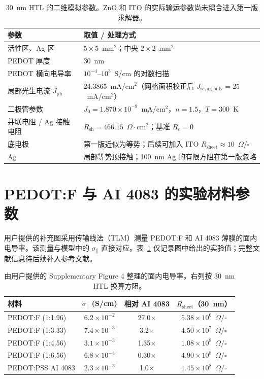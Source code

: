 \documentclass[UTF8,a4paper,11pt]{ctexart}
\newcommand{\sigpar}{\sigma_{\parallel}}
\newcommand{\Rs}{R_{\mathrm{sheet}}}
\begin{document}
\begin{table}[H]
\centering
\caption{30~nm HTL 的二维模拟参数。ZnO 和 ITO 的实际输运参数尚未耦合进入第一版求解器。}
\begin{tabularx}{0.93\textwidth}{>{\raggedright\arraybackslash}p{} X}
\toprule
参数 & 取值 / 处理方式 \\
\midrule
活性区、Ag 区 & $5\times5$~mm$^2$；中央 $2\times2$~mm$^2$ \\
PEDOT 厚度 & 30~nm \\
PEDOT 横向电导率 & $10^{-4}$--$10^3$~S/cm 的对数扫描 \\
局部光生电流 $J_{\mathrm{ph}}$ & 24.3865~mA/cm$^2$（网格面积校正后 $J_{\mathrm{sc,ag\_only}}=25$~mA/cm$^2$）\\
二极管参数 & $J_0=1.870\times10^{-9}$~mA/cm$^2$，$n=1.5$，$T=300$~K \\
并联电阻 / Ag 接触电阻 & $R_{\mathrm{sh}}=466.15$~$\Omega\cdot$cm$^2$；基准 $R_c=0$ \\
底电极 & 第一版近似为等势；后续可加入 ITO $\Rs\approx10$~$\Omega/\square$ \\
Ag & 局部等势顶接触；100~nm Ag 的有限方阻在第一版忽略 \\
\bottomrule
\end{tabularx}
\end{table}

\section{PEDOT:F 与 AI 4083 的实验材料参数}

用户提供的补充图采用传输线法（TLM）测量 PEDOT:F 和 AI 4083 薄膜的面内电导率。该测量与模型中的 $\sigpar$ 直接对应。表~\ref{tab:materials} 仅记录图中给出的实验值；完整文献信息待后续补入参考文献。

\begin{table}[H]
\centering
\caption{由用户提供的 Supplementary Figure 4 整理的面内电导率。右列按 30~nm HTL 换算方阻。}
\label{tab:materials}
\begin{tabular}{lccc}
\toprule
材料 & $\sigpar$ (S/cm) & 相对 AI 4083 & $\Rs$（30~nm） \\
\midrule
PEDOT:F (1:1.96) & $6.2\times10^{-2}$ & 27.0$\times$ & $5.38\times10^6$~$\Omega/\square$ \\
PEDOT:F (1:3.33) & $7.4\times10^{-3}$ & 3.2$\times$ & $4.50\times10^7$~$\Omega/\square$ \\
PEDOT:F (1:4.56) & $3.1\times10^{-3}$ & 1.35$\times$ & $1.08\times10^8$~$\Omega/\square$ \\
PEDOT:F (1:6.56) & $6.8\times10^{-4}$ & 0.30$\times$ & $4.90\times10^8$~$\Omega/\square$ \\
PEDOT:PSS AI 4083 & $2.3\times10^{-3}$ & 1.0$\times$ & $1.45\times10^8$~$\Omega/\square$ \\
\bottomrule
\end{tabular}
\end{table}
\end{document}
